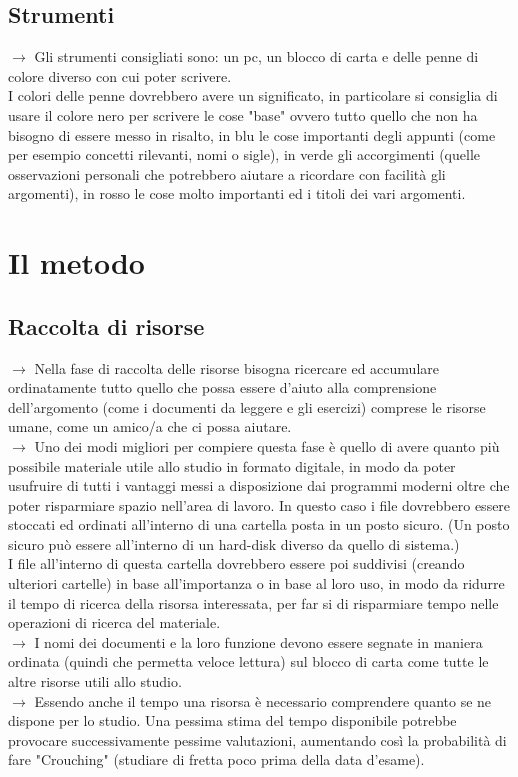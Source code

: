 \documentclass[11pt,a4paper]{article}
\begin{document}
\subsection{Strumenti}
$\rightarrow$ Gli strumenti consigliati sono: un pc, un blocco di carta e delle penne di colore diverso con cui poter scrivere.\\
 I colori delle penne dovrebbero avere un significato, in particolare si consiglia di usare il colore nero per scrivere le cose "base" ovvero tutto quello che non ha bisogno di essere messo in risalto, in blu le cose importanti degli appunti (come per esempio concetti rilevanti, nomi o sigle), in verde gli accorgimenti (quelle osservazioni personali che potrebbero aiutare a ricordare con facilità gli argomenti), in rosso le cose molto importanti ed i titoli dei vari argomenti.\\
\newline

\section{Il metodo}
\subsection{Raccolta di risorse}
$\rightarrow$ Nella fase di raccolta delle risorse bisogna ricercare ed accumulare ordinatamente tutto quello che possa essere d'aiuto alla comprensione dell'argomento (come i documenti da leggere e gli esercizi) comprese le risorse umane, come un amico/a che ci possa aiutare.\\
$\rightarrow$ Uno dei modi migliori per compiere questa fase è quello di avere quanto più possibile materiale utile allo studio in formato digitale, in modo da poter usufruire di tutti i vantaggi messi a disposizione dai programmi moderni oltre che poter risparmiare spazio nell'area di lavoro. In questo caso i file dovrebbero essere stoccati ed ordinati all'interno di una cartella posta in un posto sicuro. (Un posto sicuro può essere all'interno di un hard-disk diverso da quello di sistema.)\\
I file all'interno di questa cartella dovrebbero essere poi suddivisi (creando ulteriori cartelle) in base all'importanza o in base al loro uso, in modo da ridurre il tempo di ricerca della risorsa interessata, per far si di risparmiare tempo nelle operazioni di ricerca del materiale.\\ 
$\rightarrow$ I nomi dei documenti e la loro funzione devono essere segnate in maniera ordinata (quindi che permetta veloce lettura) sul blocco di carta come tutte le altre risorse utili allo studio.\\
$\rightarrow$ Essendo anche il tempo una risorsa è necessario comprendere quanto se ne dispone per lo studio. Una pessima stima del tempo disponibile potrebbe provocare successivamente pessime valutazioni, aumentando così la probabilità di fare "Crouching" (studiare di fretta poco prima della data d'esame).\\
\end{document}
